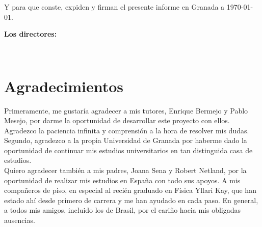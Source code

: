 \vspace{0.5cm}

Y para que conste, expiden y firman el presente informe en Granada a \today.

\vspace{1cm}

\textbf{Los directores:}

\vspace{5cm}

\noindent \textbf{\myProf \ \ \ \ \ \myOtherProf}

\chapter*{Agradecimientos}

\thispagestyle{empty}
       \vspace{1cm}


Primeramente, me gustaría agradecer a mis tutores, Enrique Bermejo y Pablo Mesejo,
por darme la oportunidad de desarrollar este proyecto con ellos. 
Agradezco la paciencia infinita y comprensión a la hora de resolver mis dudas. 
Segundo, agradezco a la propia Universidad de Granada por haberme dado la oportunidad 
de continuar mis estudios universitarios en tan distinguida casa de estudios. 
\\

Quiero agradecer también a mis padres, Joana Sena y Robert Netland, por la oportunidad 
de realizar mis estudios en España con todo sus apoyos. A mis compañeros de piso,
en especial al recién graduado en Física Yllari Kay, que han estado ahí desde 
primero de carrera y me han ayudado en cada paso. En general, a todos mis amigos, incluido los de Brasil,
por el cariño hacia mis obligadas ausencias. 
